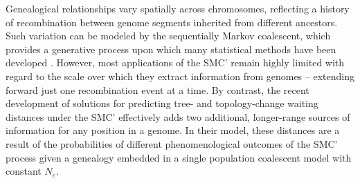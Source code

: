 \documentclass[11pt]{article}
\begin{document}
Genealogical relationships vary spatially across chromosomes, reflecting 
a history of recombination between genome segments inherited from 
different ancestors. Such variation can be modeled by the sequentially 
Markov coalescent, which provides a generative process upon which 
many statistical methods have been developed \citep{mcvean2005approximating, spence_inference_2018}.
However, most applications of the SMC' remain highly limited with regard to 
the scale over which they extract information from genomes -- extending forward 
just one recombination event at a time. 
By contrast, the recent development of solutions for predicting 
tree- and topology-change waiting distances under the SMC' \citep{deng_distribution_2021} 
effectively adds two additional, longer-range sources of information for 
any position in a genome. 
In their model,
these distances are a 
result of the probabilities of different phenomenological outcomes of the 
SMC' process given a genealogy embedded in a single population coalescent
model with constant $N_e$.
\end{document}
